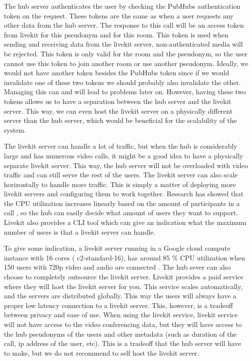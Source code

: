 \documentclass{report}
\begin{document}
The hub server authenticates the user by checking the PubHubs authentication token on the request. These tokens are
the same as when a user requests any other data from the hub server. The response to this call will be an
access token from livekit for this pseudonym and for this room. This token is used when sending and receiving data
from the livekit server, non-authenticated media will be rejected. This token is only valid for the room and the
pseudonym, so the user cannot use this token to join another room or use another pseudonym. Ideally, we would not
have another token besides the PubHubs token since if we would invalidate one of these two tokens we should probably
also invalidate the other. Managing this can and will lead to problems later on. However, having these two tokens
allows us to have a separation between the hub server and the livekit server. This way, we can even host the livekit
server on a physically different server than the hub server, which would be beneficial for the scalability of the
system.

The livekit server can handle a lot of traffic, but when the hub is considerably large and has numerous video calls, it
might be a good idea to have a physically separate livekit server. This way, the hub server will not be overloaded with
video traffic and can still serve the rest of the users. The livekit server can also scale horizontally to handle
more traffic. This is simply a matter of deploying more livekit servers and configuring them to work together.
Research has showed that the CPU utilization increases linearly based on the amount of participants in a call
\cite{Muscariello_Papalini_Roques_Sardara_Tran Van_2023}, so the hub can easily decide what amount of users they want to
support. Livekit also provides a CLI tool which can give an indication what the maximum number of users is that a
livekit server can handle.


To give some indication, a livekit server running in a Google cloud compute instance with 16 cores (
c2-standard-16), has around 85 \% CPU utilization when 150 users with 720p video and audio are connected
\cite{noauthor_benchmarking_nodate}. The hub sever can also choose to completely outsource the livekit server.
Livekit provides a paid service where they will host the livekit server for you. This service scales
automatically, and the servers are distributed globally. This way the users will always have a proper low
latency connection to a livekit server. This, however, is a tradeoff between privacy and ease of use. When using
the livekit service, livekit service will not have access to the video conferencing data, but they will have access to
the hub pseudonyms of the users and other metadata (such as duration of the call, ip address of the user, etc). This
is a tradeoff that the hub server will have to make, but we do not recommend to self host the livekit server.
\end{document}
